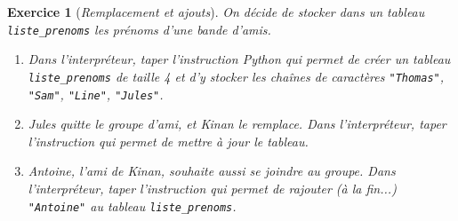 \documentclass[12pt]{article}                   %
\newcounter{exoscount}
\theoremstyle{exercicestyle}
\newtheorem{exos}[exoscount]{Exercice}
\newenvironment{exo}[2]
  {
   \begin{exos}[#1]
   \leavevmode
   \marginpar{\hfill $#2 $ }}
  {\end{exos}}
\theoremstyle{break2}
\theoremstyle{break3}
\begin{document}
\begin{exo}{\textit{Remplacement et ajouts}}{  }
    On décide de stocker dans un tableau \texttt{liste\_prenoms} les prénoms d'une bande d'amis. 
    \begin{enumerate}
        \item Dans l'interpréteur, taper l'instruction Python qui permet de créer un tableau \texttt{liste\_prenoms} de taille 4 et d'y stocker les chaînes de caractères \texttt{"Thomas"}, \texttt{"Sam"}, \texttt{"Line"}, \texttt{"Jules"}.
        \item Jules quitte le groupe d'ami, et Kinan le remplace. Dans l'interpréteur, taper l'instruction qui permet de mettre à jour le tableau. 
        \item Antoine, l'ami de Kinan, souhaite aussi se joindre au groupe. Dans l'interpréteur, taper l'instruction qui permet de rajouter (à la fin...) \texttt{"Antoine"} au tableau \texttt{liste\_prenoms}. 
    \end{enumerate}
\end{exo} 
\end{document}
